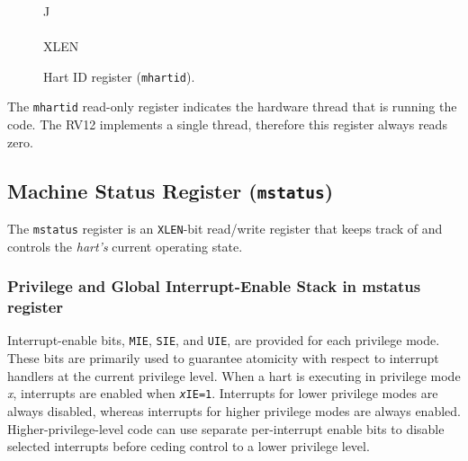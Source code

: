 \ifdefined\MARKDOWN
\else

\begin{figure*}[htb]
	{\footnotesize
		\begin{center}
			\begin{tabular}{J}
				 \\
				\hline
				\\
				\hline
				XLEN \\
			\end{tabular}
		\end{center}
	}
	\vspace{-0.1in}
	\caption{Hart ID register (\texttt{mhartid}).}
	\label{fig:mhartidreg}
\end{figure*}

\fi

The \texttt{mhartid} read-only register indicates the hardware thread that is
running the code. The RV12 implements a single thread, therefore this
register always reads zero.

\subsection{Machine Status Register
(\texttt{mstatus})}\label{machine-status-register-mstatus}

The \texttt{mstatus} register is an \texttt{XLEN}-bit read/write register that keeps track
of and controls the \emph{hart's} current operating state.

\subsubsection{Privilege and Global Interrupt-Enable Stack in mstatus register}

Interrupt-enable bits, \texttt{MIE}, \texttt{SIE}, and \texttt{UIE}, are provided for each
privilege mode. These bits are primarily used to guarantee atomicity
with respect to interrupt handlers at the current privilege level. When
a hart is executing in privilege mode \emph{x}, interrupts are enabled
when \texttt{\emph{x}IE=1}. Interrupts for lower privilege modes are always
disabled, whereas interrupts for higher privilege modes are always
enabled. Higher-privilege-level code can use separate per-interrupt
enable bits to disable selected interrupts before ceding control to a
lower privilege level.

\ifdefined\MARKDOWN
\else

